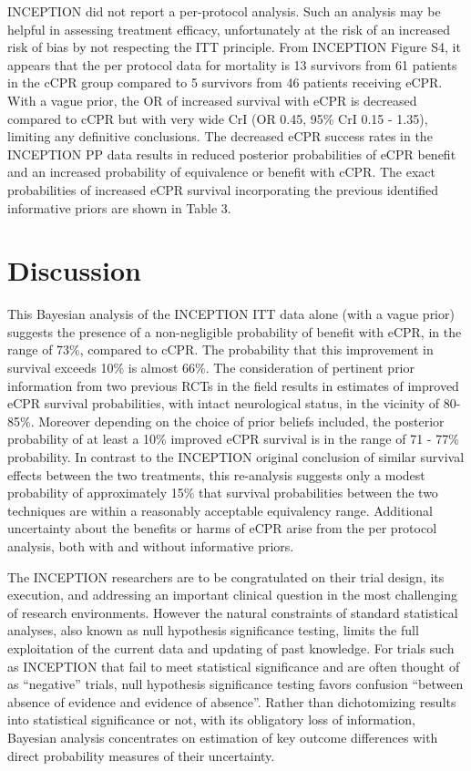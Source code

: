 \documentclass[
  super,
  preprint,
  3p]{elsarticle}
\begin{document}
INCEPTION did not report a per-protocol analysis. Such an analysis may
be helpful in assessing treatment efficacy, unfortunately at the risk of
an increased risk of bias by not respecting the ITT principle. From
INCEPTION Figure S4\citep{CPR2023a}, it appears that the per protocol
data for mortality is 13 survivors from 61 patients in the cCPR group
compared to 5 survivors from 46 patients receiving eCPR. With a vague
prior, the OR of increased survival with eCPR is decreased compared to
cCPR but with very wide CrI (OR 0.45, 95\% CrI 0.15 - 1.35), limiting
any definitive conclusions. The decreased eCPR success rates in the
INCEPTION PP data results in reduced posterior probabilities of eCPR
benefit and an increased probability of equivalence or benefit with
cCPR. The exact probabilities of increased eCPR survival incorporating
the previous identified informative priors are shown in Table 3.

\hypertarget{discussion}{%
\section{Discussion}\label{discussion}}

This Bayesian analysis of the INCEPTION ITT data alone (with a vague
prior) suggests the presence of a non-negligible probability of benefit
with eCPR, in the range of 73\%, compared to cCPR. The probability that
this improvement in survival exceeds 10\% is almost 66\%. The
consideration of pertinent prior information from two previous
RCTs\citep{RN6751, RN6759} in the field results in estimates of improved
eCPR survival probabilities, with intact neurological status, in the
vicinity of 80-85\%. Moreover depending on the choice of prior beliefs
included, the posterior probability of at least a 10\% improved eCPR
survival is in the range of 71 - 77\% probability. In contrast to the
INCEPTION original conclusion of similar survival effects between the
two treatments, this re-analysis suggests only a modest probability of
approximately 15\% that survival probabilities between the two
techniques are within a reasonably acceptable equivalency range.
Additional uncertainty about the benefits or harms of eCPR arise from
the per protocol analysis, both with and without informative priors.

The INCEPTION researchers are to be congratulated on their trial design,
its execution, and addressing an important clinical question in the most
challenging of research environments. However the natural constraints of
standard statistical analyses, also known as null hypothesis
significance testing, limits the full exploitation of the current data
and updating of past knowledge. For trials such as INCEPTION that fail
to meet statistical significance and are often thought of as
``negative'' trials, null hypothesis significance testing favors
confusion ``between absence of evidence and evidence of
absence''\citep{RN6765}. Rather than dichotomizing results into
statistical significance or not, with its obligatory loss of
information, Bayesian analysis concentrates on estimation of key outcome
differences with direct probability measures of their uncertainty.
\end{document}

